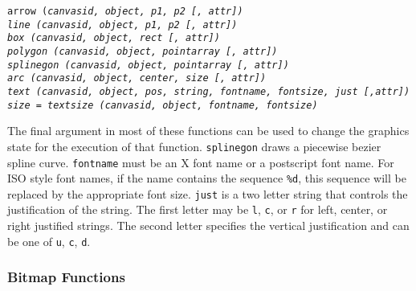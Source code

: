 \begin{flushleft}
\tt arrow (\it canvasid, object, p1, p2 [, attr]\/\tt )\\
\tt line (\it canvasid, object, p1, p2 [, attr]\/\tt )\\
\tt box (\it canvasid, object, rect [, attr]\/\tt )\\
\tt polygon (\it canvasid, object, pointarray [, attr]\/\tt )\\
\tt splinegon (\it canvasid, object, pointarray [, attr]\/\tt )\\
\tt arc (\it canvasid, object, center, size [, attr]\/\tt )\\
\tt text (\it canvasid, object, pos, string, fontname, fontsize, just [,attr]\/\tt )\\
\it size \tt = textsize (\it canvasid, object, fontname, fontsize\tt )\\
\end{flushleft}\vspace{-2\itemsep}
The final argument in most of these functions can be used to change the
graphics state for the execution of that function. {\tt splinegon} draws a
piecewise bezier spline curve. {\tt fontname} must be an X font name or a
postscript font name. For ISO style font names, if the name contains the
sequence {\tt \%d}, this sequence will be replaced by the appropriate font
size.  {\tt just} is a two letter string that controls the justification of the
string. The first letter may be {\tt l}, {\tt c}, or {\tt r} for left, center,
or right justified strings. The second letter specifies the vertical
justification and can be one of {\tt u}, {\tt c}, {\tt d}.

\subsubsection{Bitmap Functions}

